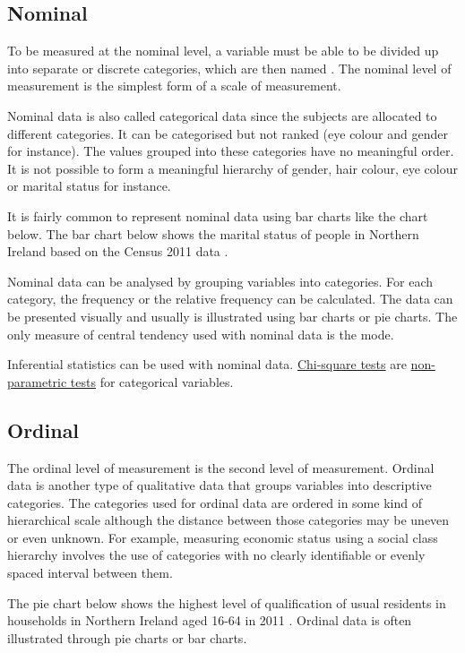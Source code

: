 \documentclass[
]{book}
\begin{document}
\hypertarget{nominal}{%
\subsection{Nominal}\label{nominal}}

To be measured at the nominal level, a variable must be able to be divided up into separate or discrete categories, which are then named \citep{mchugh2}. The nominal level of measurement is the simplest form of a scale of measurement.

Nominal data is also called categorical data since the subjects are allocated to different categories. It can be categorised but not ranked (eye colour and gender for instance). The values grouped into these categories have no meaningful order. It is not possible to form a meaningful hierarchy of gender, hair colour, eye colour or marital status for instance.

It is fairly common to represent nominal data using bar charts like the chart below. The bar chart below shows the marital status of people in Northern Ireland based on the Census 2011 data \citep{census2011}.

Nominal data can be analysed by grouping variables into categories. For each category, the frequency or the relative frequency can be calculated. The data can be presented visually and usually is illustrated using bar charts or pie charts. The only measure of central tendency used with nominal data is the mode.

Inferential statistics can be used with nominal data. \protect\hyperlink{chisq}{Chi-square tests} are \protect\hyperlink{nonpara}{non-parametric tests} for categorical variables.

\hypertarget{ordinal}{%
\subsection{Ordinal}\label{ordinal}}

The ordinal level of measurement is the second level of measurement. Ordinal data is another type of qualitative data that groups variables into descriptive categories. The categories used for ordinal data are ordered in some kind of hierarchical scale although the distance between those categories may be uneven or even unknown. For example, measuring economic status using a social class hierarchy involves the use of categories with no clearly identifiable or evenly spaced interval between them.

The pie chart below shows the highest level of qualification of usual residents in households in Northern Ireland aged 16-64 in 2011 \citep{census2011b}. Ordinal data is often illustrated through pie charts or bar charts.
\end{document}
